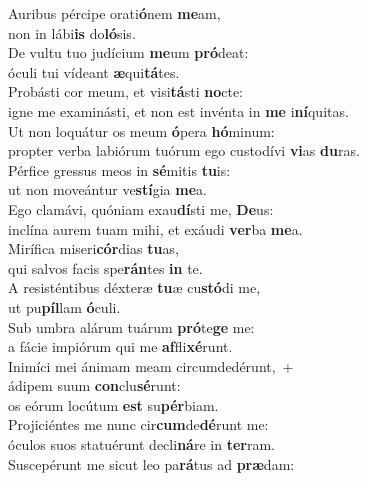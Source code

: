 \evenverse Auribus pércipe orati\textbf{ó}nem \textbf{me}am,~\*\\
\evenverse non in lábi\textbf{is} do\textbf{ló}sis.\\
\oddverse De vultu tuo judícium \textbf{me}um \textbf{pró}deat:~\*\\
\oddverse óculi tui vídeant \textbf{æ}qui\textbf{tá}tes.\\
\evenverse Probásti cor meum, et visi\textbf{tá}sti \textbf{no}cte:~\*\\
\evenverse igne me examinásti, et non est invénta in \textbf{me} i\textbf{ní}quitas.\\
\oddverse Ut non loquátur os meum \textbf{ó}pera \textbf{hó}minum:~\*\\
\oddverse propter verba labiórum tuórum ego custodívi \textbf{vi}as \textbf{du}ras.\\
\evenverse Pérfice gressus meos in \textbf{sé}mitis \textbf{tu}is:~\*\\
\evenverse ut non moveántur ve\textbf{stí}gia \textbf{me}a.\\
\oddverse Ego clamávi, quóniam exau\textbf{dí}sti me, \textbf{De}us:~\*\\
\oddverse inclína aurem tuam mihi, et exáudi \textbf{ver}ba \textbf{me}a.\\
\evenverse Mirífica miseri\textbf{cór}dias \textbf{tu}as,~\*\\
\evenverse qui salvos facis spe\textbf{rán}tes \textbf{in} te.\\
\oddverse A resisténtibus déxteræ \textbf{tu}æ cu\textbf{stó}di me,~\*\\
\oddverse ut pu\textbf{píl}lam \textbf{ó}culi.\\
\evenverse Sub umbra alárum tuárum \textbf{pró}te\textbf{ge} me:~\*\\
\evenverse a fácie impiórum qui me \textbf{af}fli\textbf{xé}runt.\\
\oddverse Inimíci mei ánimam meam circumdedérunt,~+\\
\oddverse  ádipem suum \textbf{con}clu\textbf{sé}runt:~\*\\
\oddverse os eórum locútum \textbf{est} su\textbf{pér}biam.\\
\evenverse Projiciéntes me nunc cir\textbf{cum}de\textbf{dé}runt me:~\*\\
\evenverse óculos suos statuérunt decli\textbf{ná}re in \textbf{ter}ram.\\
\oddverse Suscepérunt me sicut leo pa\textbf{rá}tus ad \textbf{præ}dam:~\*\\
